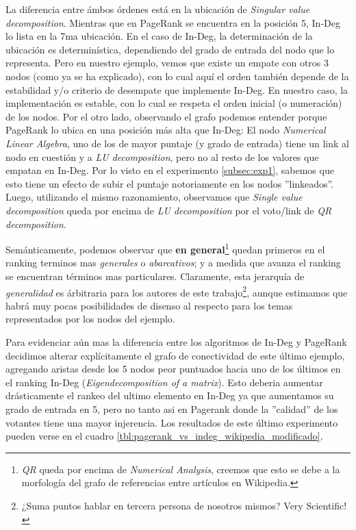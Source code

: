 \par La diferencia entre \'ambos \'ordenes est\'a en la ubicaci\'on de
\emph{Singular value decomposition}. Mientras que en PageRank se encuentra en la
posici\'on 5, In-Deg lo lista en la 7ma ubicaci\'on. En el caso de In-Deg, la
determinaci\'on de la ubicaci\'on es determin\'istica, dependiendo del grado de
entrada del nodo que lo representa. Pero en nuestro ejemplo, vemos que existe un
empate con otros 3 nodos (como ya se ha explicado), con lo cual aqu\'i el orden
tambi\'en depende de la estabilidad y/o criterio de desempate que implemente
In-Deg. En nuestro caso, la implementaci\'on es estable, con lo cual se respeta
el orden inicial (o numeraci\'on) de los nodos. Por el otro lado, observando el
grafo podemos entender porque PageRank lo ubica en una posici\'on m\'as alta que
In-Deg: El nodo \emph{Numerical Linear Algebra}, uno de los de mayor puntaje (y
grado de entrada) tiene un link al nodo en cuesti\'on y a \emph{LU
decomposition}, pero no al resto de los valores que empatan en In-Deg. Por lo
visto en el experimento \ref{subsec:exp1}, sabemos que esto tiene un efecto de
subir el puntaje notoriamente en los nodos ''linkeados''. Luego, utilizando el
mismo razonamiento, observamos que \emph{Single value decomposition} queda por
encima de \emph{LU decomposition} por el voto/link de \emph{QR decomposition}.

\par Semánticamente, podemos observar que \textbf{en general}\footnote{\emph{QR}
queda por encima de \emph{Numerical Analysis}, creemos que esto se debe a la
morfología del grafo de referencias entre artículos en Wikipedia.} quedan
primeros en el ranking terminos mas \emph{generales} o \emph{abarcativos}; y a
medida que avanza el ranking se encuentran términos mas particulares.
Claramente, esta jerarqu\'ia de \emph{generalidad} es \'arbitraria para los
autores de este trabajo\footnote{¿Suma puntos hablar en tercera persona de
nosotros mismos? Very Scientific!}, aunque estimamos que habr\'a muy pocas
posibilidades de disenso al respecto para los temas representados por los nodos
del ejemplo.

\par Para evidenciar aún mas la diferencia entre los algoritmos de In-Deg y
PageRank decidimos alterar expl\'icitamente el grafo de conectividad de este
\'ultimo ejemplo, agregando aristas desde los 5 nodos peor puntuados hacia uno
de los últimos en el ranking In-Deg (\emph{Eigendecomposition of a matrix}).
Esto deberia aumentar drásticamente el rankeo del ultimo elemento en In-Deg ya
que aumentamos su grado de entrada en 5, pero no tanto asi en Pagerank donde la
''calidad'' de los votantes tiene una mayor injerencia. Los resultados de este
último experimento pueden verse en el cuadro
\ref{tbl:pagerank_vs_indeg_wikipedia_modificado}. 


